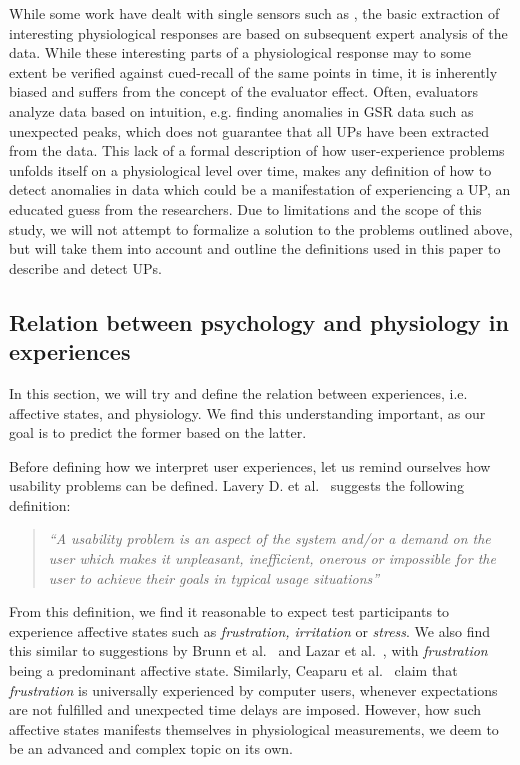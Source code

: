 While some work have dealt with single sensors such as \cite{mind_the_gap} \cite{LH-paper}, the basic extraction of
interesting physiological responses are based on subsequent expert analysis of the data.  While these interesting parts
of a physiological response may to some extent be verified against cued-recall of the same points in time, it is
inherently biased and suffers from the concept of the evaluator effect. Often, evaluators analyze data based on
intuition, e.g. finding anomalies in GSR data such as unexpected peaks, which does not guarantee that all UPs have been
extracted from the data.  This lack of a formal description of how user-experience problems unfolds itself on a
physiological level over time, makes any definition of how to detect anomalies in data which could be a manifestation of
experiencing a UP, an educated guess from the researchers.  Due to limitations and the scope of this study, we will not
attempt to formalize a solution to the problems outlined above, but will take them into account and outline the
definitions used in this paper to describe and detect UPs.


\subsection{Relation between psychology and physiology in experiences}
In this section, we will try and define the relation between experiences, i.e. affective states, and physiology. We find
this understanding important, as our goal is to predict the former based on the latter.

Before defining how we interpret user experiences, let us remind ourselves how usability problems can be
defined. Lavery D. et al.~\cite[p. 254]{comp-eval-methods} suggests the following definition:

\begin{quotation}
  \textit{``A usability problem is an aspect of the system and/or a demand on the user which makes it unpleasant,
    inefficient, onerous or impossible for the user to achieve their goals in typical usage situations''} 
\end{quotation}

From this definition, we find it reasonable to expect test participants to experience affective states such as
\textit{frustration, irritation} or \textit{stress}. We also find this similar to suggestions by Brunn et
al.~\cite{LH-paper} and Lazar et al.~\cite{frustration_with_computers}, with \textit{frustration} being a predominant
affective state. Similarly, Ceaparu et al.~\cite{determining-causes-end-user-frust} claim that \textit{frustration} is
universally experienced by computer users, whenever expectations are not fulfilled and unexpected time delays are
imposed. However, how such affective states manifests themselves in physiological measurements, we deem to be an
advanced and complex topic on its own.

